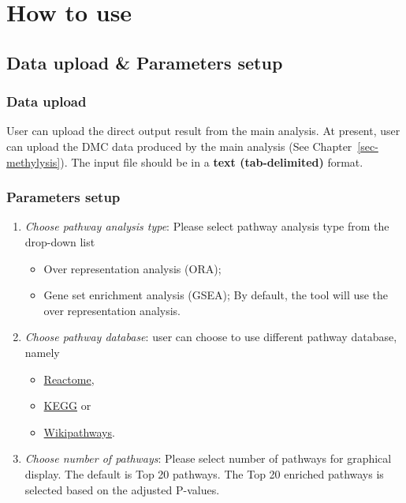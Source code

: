 \documentclass[
  a4paper,
  DIV=11,
  numbers=noendperiod,
  oneside,
  open=any]{scrreport}
\providecommand{\tightlist}{%
  \setlength{\itemsep}{0pt}\setlength{\parskip}{0pt}}\usepackage{longtable,booktabs,array}
\begin{document}
\section{How to use}\label{how-to-use-8}

\subsection{Data upload \& Parameters
setup}\label{data-upload-parameters-setup-5}

\subsubsection{Data upload}\label{data-upload-5}

User can upload the direct output result from the main analysis. At
present, user can upload the DMC data produced by the main analysis (See
Chapter~\ref{sec-methylysis}). The input file should be in a
\textbf{text (tab-delimited)} format.

\subsubsection{Parameters setup}\label{parameters-setup-2}

\begin{enumerate}
\def\labelenumi{\arabic{enumi}.}
\tightlist
\item
  \emph{Choose pathway analysis type}: Please select pathway analysis
  type from the drop-down list

  \begin{itemize}
  \tightlist
  \item
    Over representation analysis (ORA);
  \item
    Gene set enrichment analysis (GSEA); By default, the tool will use
    the over representation analysis.
  \end{itemize}
\item
  \emph{Choose pathway database}: user can choose to use different
  pathway database, namely

  \begin{itemize}
  \tightlist
  \item
    \href{https://reactome.org/}{Reactome},
  \item
    \href{https://www.genome.jp/kegg/}{KEGG} or
  \item
    \href{https://www.wikipathways.org/}{Wikipathways}.
  \end{itemize}
\item
  \emph{Choose number of pathways}: Please select number of pathways for
  graphical display. The default is Top 20 pathways. The Top 20 enriched
  pathways is selected based on the adjusted P-values.
\end{enumerate}
\end{document}
